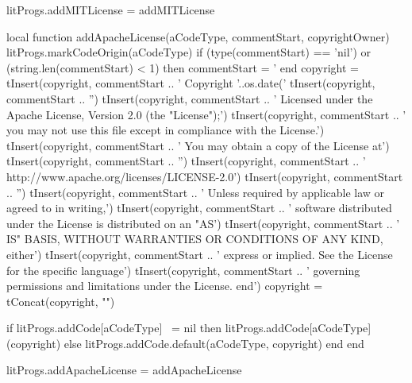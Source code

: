 litProgs.addMITLicense = addMITLicense

local function addApacheLicense(aCodeType, commentStart, copyrightOwner)
  litProgs.markCodeOrigin(aCodeType)
  if (type(commentStart) == 'nil') or (string.len(commentStart) < 1) then
    commentStart = '%
  end
  copyright = { }
  tInsert(copyright, commentStart ..
    ' Copyright '..os.date('%
  tInsert(copyright,  commentStart ..
    '')
  tInsert(copyright, commentStart ..
    ' Licensed under the Apache License, Version 2.0 (the "License");')
  tInsert(copyright, commentStart ..
    ' you may not use this file except in compliance with the License.')
  tInsert(copyright, commentStart ..
    ' You may obtain a copy of the License at')
  tInsert(copyright, commentStart ..
    '')
  tInsert(copyright, commentStart ..
    '    http://www.apache.org/licenses/LICENSE-2.0')
  tInsert(copyright, commentStart ..
    '')
  tInsert(copyright, commentStart ..
    ' Unless required by applicable law or agreed to in writing,')
  tInsert(copyright, commentStart ..
    ' software distributed under the License is distributed on an "AS')
  tInsert(copyright, commentStart ..
    ' IS" BASIS, WITHOUT WARRANTIES OR CONDITIONS OF ANY KIND, either')
  tInsert(copyright, commentStart ..
    ' express or implied. See the License for the specific language')
  tInsert(copyright, commentStart ..
    ' governing permissions and limitations under the License. end')
  copyright = tConcat(copyright, "\n")

  if litProgs.addCode[aCodeType] ~= nil then
    litProgs.addCode[aCodeType](copyright)
  else
    litProgs.addCode.default(aCodeType, copyright)
  end
end

litProgs.addApacheLicense = addApacheLicense
\stopLuaCode

\startMkIVCode
\unexpanded\def\setLitProgsOriginMarker{
  \dotripleempty\doSetLitProgsOriginMarker%
}

\unexpanded{}

